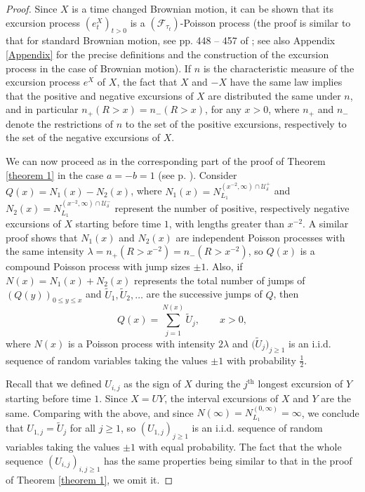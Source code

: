 \documentclass[reqno]{amsart}
\theoremstyle{definition}
\theoremstyle{remark}
\numberwithin{equation}{section}
\begin{document}
\begin{proof}
Since $X$ is a time changed Brownian motion, it can be shown that its excursion process $(e_t^X)_{t>0}$ is a $(\mathcal{F}_{\tau_t})$-Poisson process (the proof is similar to that for standard Brownian motion, see pp. 448 -- 457 of \cite{Revuz and Yor}; see also Appendix \ref{Appendix} for the precise definitions and the construction of the excursion process in the case of Brownian motion). If $n$ is the characteristic measure of the excursion process $e^X$ of $X$, the fact that $X$ and $-X$ have the same law implies that the positive and negative excursions of $X$ are distributed the same under $n$, and in particular $n_+(R>x)=n_-(R>x)$, for any $x>0$, where $n_+$ and $n_-$ denote the restrictions of $n$ to the set of the positive excursions, respectively to the set of the negative excursions of $X$.

We can now proceed as in the corresponding part of the proof of Theorem \ref{theorem 1} in the case $a=-b=1$ (see p. \pageref{N_1 and N_2}). Consider $Q(x)=N_1(x)-N_2(x)$, where $N_1(x) = N_{L_1}^{(x^{-2},\infty)\cap\mathcal{U}_\delta^+}$ and $N_2(x)=N_{L_1}^{(x^{-2},\infty)\cap\mathcal{U}_\delta^-}$ represent the number of positive, respectively negative excursions of $X$ starting before time $1$, with lengths greater than $x^{-2}$. A similar proof shows that $N_1(x)$ and $N_2(x)$ are independent Poisson processes with the same intensity $\lambda=n_+(R>x^{-2})=n_-(R>x^{-2})$, so $Q(x)$ is a compound Poisson process with jump sizes $\pm1$. Also, if $N(x)=N_1(x)+N_2(x)$ represents the total number of jumps of $(Q(y))_{0\leq y \leq x}$ and $\widetilde{U}_1, \widetilde{U}_2,\ldots$ are the successive jumps of $Q$, then
\begin{equation}
Q(x)=\sum_{j=1}^{N(x)} \widetilde{U}_j, \qquad x>0,
\end{equation}
where $N(x)$ is a Poisson process with intensity $2\lambda$ and  $\big(\widetilde{U}_j\big)_{j\geq1}$ is an i.i.d. sequence of random variables taking the values $\pm1$ with probability $\frac12$.

Recall that we defined $U_{i,j}$ as the sign of $X$ during the $j^\text{th}$ longest excursion of $Y$ starting before time $1$. Since $X=U Y$, the interval excursions of $X$ and $Y$ are the same. Comparing with the above, and since $N(\infty)=N_{L_1}^{(0,\infty)}=\infty$, we conclude that $U_{1,j}=\widetilde{U}_j$ for all $j\geq 1$, so $(U_{1,j})_{j\geq1}$ is an i.i.d. sequence of random variables taking the values $\pm 1$ with equal probability. The fact that the whole sequence $(U_{i,j})_{i,j \geq 1}$ has the same properties being similar to that in the proof of Theorem \ref{theorem 1}, we omit it.


\end{proof}
\end{document}
